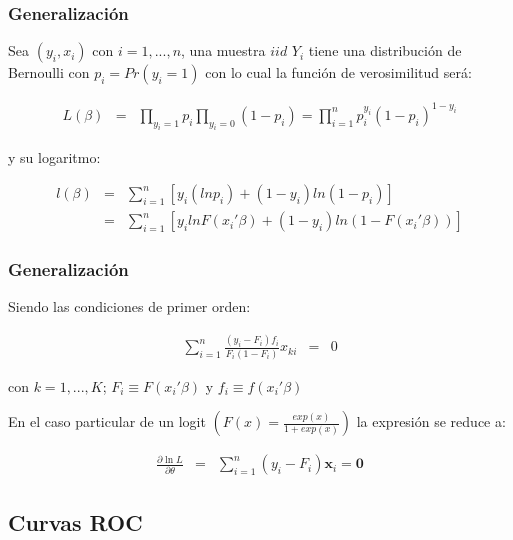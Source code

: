 \begin{frame}[fragile]
	\frametitle{Generalización}
	
	Sea $(y_i,x_i)$ con $i=1,...,n$, una muestra $iid$ $Y_i$ tiene una
	distribución de Bernoulli con $p_i=Pr(y_i=1)$ con lo cual la
	función de verosimilitud será:
	
	
	\begin{eqnarray*}
		L(\beta) &=& \prod_{y_i=1}p_i \prod_{y_i=0}(1-p_i)=\prod_{i=1}^n p_i^{y_i}(1-p_i)^{1-y_i}
	\end{eqnarray*}
	
	
	
	y su logaritmo:
	
	\begin{eqnarray*}
		l(\beta) &=& \sum_{i=1}^n [y_i (ln p_i)+(1-y_i)ln(1-p_i)] \\
		&=& \sum_{i=1}^n [y_i ln F(x_i'\beta)+(1-y_i)ln(1-F(x_i'\beta))]
	\end{eqnarray*}
	
\end{frame}

\begin{frame}[fragile]
	\frametitle{Generalización}
	
	Siendo las condiciones de primer orden:
	
	\begin{eqnarray*}
		\sum_{i=1}^n\frac{(y_i-F_i)f_i}{F_i(1-F_i)}x_{ki}&=&0
	\end{eqnarray*}
	
	con $k=1,...,K$; $F_i\equiv F(x_i'\beta)$ y $f_i\equiv
	f(x_i'\beta)$
	\smallskip
	
	
	
	En el caso particular de un logit
	$(F(x)=\frac{exp(x)}{1+exp(x)})$ la expresión se reduce a:
	
	\begin{eqnarray*}
		\frac{\partial \ln L}{\partial \theta }&=&\sum_{i=1}^{n}(y_{i}-F_i)\mathbf{x}%
		_{i}=\mathbf{0}
	\end{eqnarray*}
\end{frame}

\subsection{Curvas ROC}

